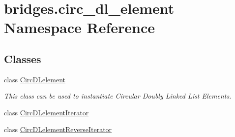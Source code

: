 \hypertarget{namespacebridges_1_1circ__dl__element}{}\section{bridges.\+circ\+\_\+dl\+\_\+element Namespace Reference}
\label{namespacebridges_1_1circ__dl__element}
\subsection*{Classes}
\begin{DoxyCompactItemize}
\item 
class \hyperlink{classbridges_1_1circ__dl__element_1_1_circ_d_lelement}{Circ\+D\+Lelement}
\begin{DoxyCompactList}\small\item\em This class can be used to instantiate Circular Doubly Linked List Elements. \end{DoxyCompactList}\item 
class \hyperlink{classbridges_1_1circ__dl__element_1_1_circ_d_lelement_iterator}{Circ\+D\+Lelement\+Iterator}
\item 
class \hyperlink{classbridges_1_1circ__dl__element_1_1_circ_d_lelement_reverse_iterator}{Circ\+D\+Lelement\+Reverse\+Iterator}
\end{DoxyCompactItemize}
